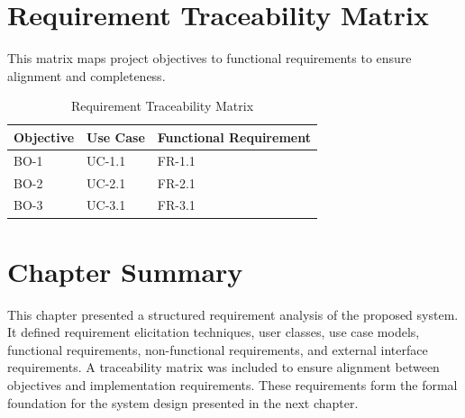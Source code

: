 \section{Requirement Traceability Matrix}

This matrix maps project objectives to functional requirements to ensure alignment and completeness.

\begin{table}[h]
\centering
\caption{Requirement Traceability Matrix}

\begin{tabularx}{\textwidth}{|p{3cm}|p{3cm}|X|}
\hline
\textbf{Objective} & \textbf{Use Case} & \textbf{Functional Requirement} \\ \hline
BO-1 & UC-1.1 & FR-1.1 \\ \hline
BO-2 & UC-2.1 & FR-2.1 \\ \hline
BO-3 & UC-3.1 & FR-3.1 \\ \hline
\end{tabularx}

\end{table}



\section*{Chapter Summary}

This chapter presented a structured requirement analysis of the proposed system. 
It defined requirement elicitation techniques, user classes, use case models, 
functional requirements, non-functional requirements, and external interface requirements. 
A traceability matrix was included to ensure alignment between objectives and implementation requirements. 
These requirements form the formal foundation for the system design presented in the next chapter.
